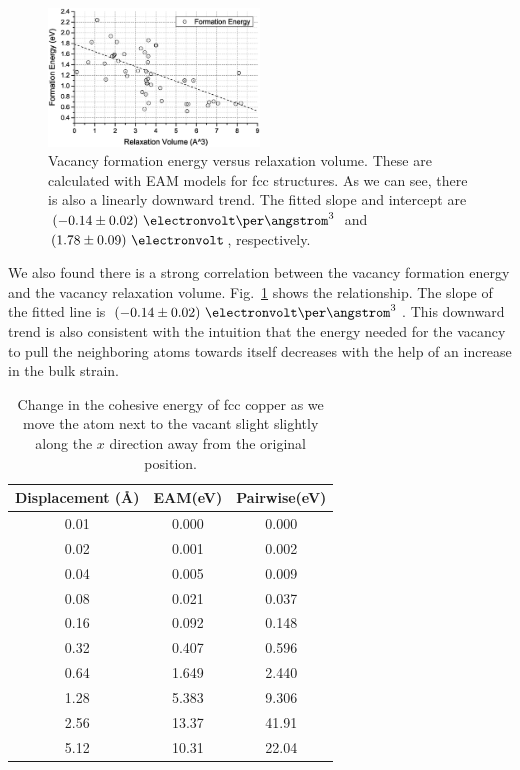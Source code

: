 \documentclass[%
 reprint,
 amsmath,amssymb,
 aps,
]{revtex4-1}
\begin{document}
\begin{figure}
\centering
\includegraphics[width=0.5\textwidth, clip, trim = 10mm 3mm 10mm 10mm]{vfe_vs_vrv}%
\caption{\label{fig:vfevsvrv}
Vacancy formation energy versus relaxation volume.
These are calculated with EAM models for fcc structures.
As we can see, there is also a linearly downward trend.
The fitted slope and intercept are $(-0.14\pm0.02)~\electronvolt\per\angstrom^3$ and $(1.78\pm0.09)~\electronvolt$, respectively.
}
\end{figure}

We also found there is a strong correlation between the vacancy formation energy and the vacancy relaxation volume.
Fig.~\ref{fig:vfevsvrv} shows the relationship.
The slope of the fitted line is $(-0.14\pm0.02)~\electronvolt\per\angstrom^3$.
This downward trend is also consistent with the intuition that the energy needed for the vacancy to pull the neighboring atoms towards itself decreases with the help of an increase in the bulk strain.

\begin{table}
\caption{\label{tab:relation}
 Change in the cohesive energy of fcc copper as we move the atom next to the vacant slight slightly along the $x$ direction away from the original position.
}
\begin{ruledtabular}
\begin{tabular}{c c c}
 Displacement (\AA) & EAM\footnotemark[1] (eV) & Pairwise\footnotemark[2] (eV)\\
\hline
0.01 & 0.000 & 0.000 \\
0.02 & 0.001 & 0.002 \\
0.04 & 0.005 & 0.009 \\
0.08 & 0.021 & 0.037 \\
0.16 & 0.092 & 0.148 \\
0.32 & 0.407 & 0.596 \\
0.64 & 1.649 & 2.440 \\
1.28 & 5.383 & 9.306 \\
2.56 & 13.37 & 41.91 \\
5.12 & 10.31 & 22.04 \\
\end{tabular}
\end{ruledtabular}
\end{table}
\end{document}
